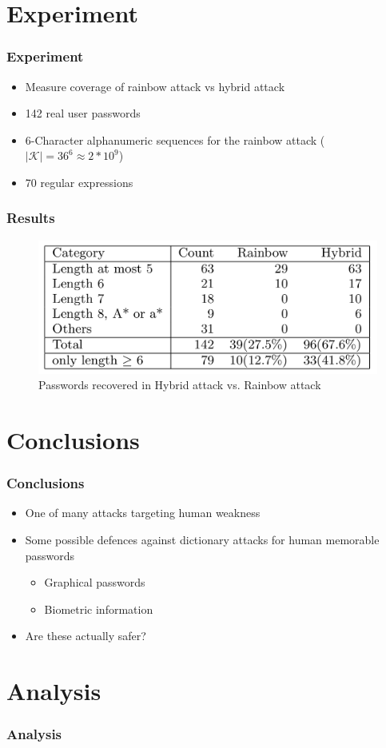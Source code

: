 \documentclass{beamer}
\begin{document}
\section{Experiment} 
\begin{frame}
\frametitle{Experiment}
\begin{itemize}
\item Measure coverage of rainbow attack vs hybrid attack
\item 142 real user passwords
\item 6-Character alphanumeric sequences for the rainbow attack ($|\mathcal{K}| = 36^6 \approx 2*10^9 $)
\item 70 regular expressions
\end{itemize}
\end{frame}

\begin{frame}
\frametitle{Results}
\begin{figure}
\includegraphics[width=0.9\linewidth]{figs/results}
\caption{Passwords recovered in Hybrid attack vs. Rainbow attack}
\end{figure}
\end{frame}

\section{Conclusions} 

\begin{frame}
\frametitle{Conclusions}
\begin{itemize}
\item One of many attacks targeting human weakness
\item Some possible defences against dictionary attacks for human memorable passwords
\begin{itemize}
\item Graphical passwords
\item Biometric information
\end{itemize}
\item Are these actually safer?
\end{itemize}
\end{frame}


\section{Analysis} 
\begin{frame}
\frametitle{Analysis}

\end{frame}
\end{document}
